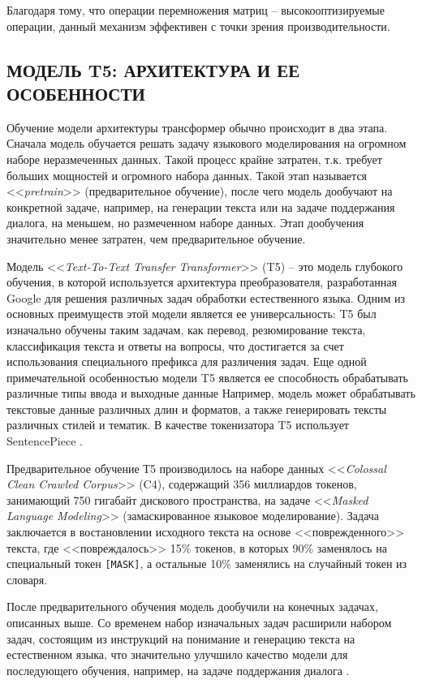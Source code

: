 Благодаря тому, что операции перемножения матриц -- высокооптизируемые операции, данный механизм эффективен с точки зрения производительности.

\subsection{МОДЕЛЬ T5: АРХИТЕКТУРА И ЕЕ ОСОБЕННОСТИ}
Обучение модели архитектуры трансформер обычно происходит в два этапа. Сначала модель обучается решать задачу языкового моделирования на огромном наборе неразмеченных данных. Такой процесс крайне затратен, т.к. требует больших мощностей и огромного набора данных. Такой этап называется <<\textit{pretrain}>> (предварительное обучение), после чего модель дообучают на конкретной задаче, например, на генерации текста или на задаче поддержания диалога, на меньшем, но размеченном наборе данных. Этап дообучения значительно менее затратен, чем предварительное обучение.

Модель <<\textit{Text-To-Text Transfer Transformer}>> (T5) -- это модель глубокого обучения, в которой используется архитектура преобразователя, разработанная Google для решения различных задач обработки естественного языка. Одним из основных преимуществ этой модели является ее универсальность: T5 был изначально обучены таким задачам, как перевод, резюмирование текста, классификация текста и ответы на вопросы, что достигается за счет использования специального префикса для различения задач. Еще одной примечательной особенностью модели T5 является ее способность обрабатывать различные типы ввода и выходные данные Например, модель может обрабатывать текстовые данные различных длин и форматов, а также генерировать тексты различных стилей и тематик. В качестве токенизатора T5 использует SentencePiece \cite{sentencepiece-paper}.

Предварительное обучение Т5 производилось на наборе данных <<\textit{Colossal Clean Crawled Corpus}>> (C4), содержащий 356 миллиардов токенов, занимающий 750 гигабайт дискового пространства, на задаче <<\textit{Masked Language Modeling}>> (замаскированное языковое моделирование). Задача заключается в востановлении исходного текста на основе <<поврежденного>> текста, где <<повреждалось>> 15\% токенов, в которых 90\% заменялось на специальный токен \texttt{[MASK]}, а остальные 10\% заменялись на случайный токен из словаря.

После предварительного обучения модель дообучили на конечных задачах, описанных выше. Со временем набор изначальных задач расширили набором задач, состоящим из инструкций на понимание и генерацию текста на естественном языка, что значительно улучшило качество модели для последующего обучения, например, на задаче поддержания диалога \cite{flan-paper}.

